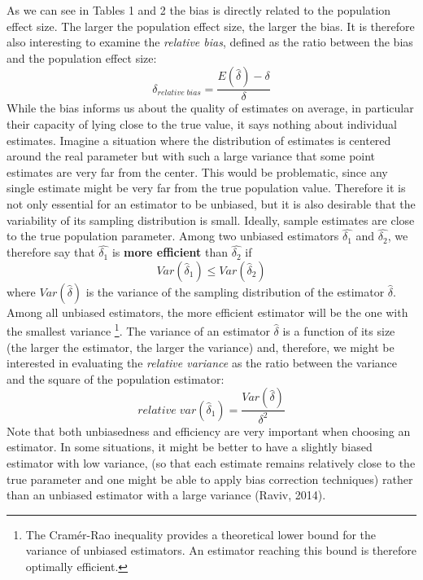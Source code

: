 \documentclass[
  english,
  man,floatsintext]{apa6}
\begin{document}
As we can see in Tables 1 and 2 the bias is directly related to the population effect size. The larger the population effect size, the larger the bias. It is therefore also interesting to examine the \emph{relative bias}, defined as the ratio between the bias and the population effect size:
\begin{equation} 
\delta_{relative \; bias}=\frac{E(\hat{\delta})-\delta}{\delta}
\label{eq:RELBIAS} 
\end{equation}
While the bias informs us about the quality of estimates on average, in particular their capacity of lying close to the true value, it says nothing about individual estimates. Imagine a situation where the distribution of estimates is centered around the real parameter but with such a large variance that some point estimates are very far from the center. This would be problematic, since any single estimate might be very far from the true population value. Therefore it is not only essential for an estimator to be unbiased, but it is also desirable that the variability of its sampling distribution is small. Ideally, sample estimates are close to the true population parameter. Among two unbiased estimators \(\hat{\delta_1}\) and \(\hat{\delta_2}\), we therefore say that \(\hat{\delta_1}\) is \textbf{more efficient} than \(\hat{\delta_2}\) if
\begin{equation} 
Var(\hat{\delta}_1) \leq Var(\hat{\delta}_2)
\label{eq:EFFICIENCY} 
\end{equation}
where \(Var(\hat{\delta})\) is the variance of the sampling distribution of the estimator \(\hat{\delta}\). Among all unbiased estimators, the more efficient estimator will be the one with the smallest variance \footnote{The Cramér-Rao inequality provides a theoretical lower bound for the variance of unbiased estimators. An estimator reaching this bound is therefore optimally efficient.}. The variance of an estimator \(\hat{\delta}\) is a function of its size (the larger the estimator, the larger the variance) and, therefore, we might be interested in evaluating the \emph{relative variance} as the ratio between the variance and the square of the population estimator:
\begin{equation} 
relative \; var(\hat{\delta}_1)=\frac{Var(\hat{\delta})}{\delta^2}
\label{eq:RELVAR} 
\end{equation}
Note that both unbiasedness and efficiency are very important when choosing an estimator. In some situations, it might be better to have a slightly biased estimator with low variance, (so that each estimate remains relatively close to the true parameter and one might be able to apply bias correction techniques) rather than an unbiased estimator with a large variance (Raviv, 2014).
\end{document}
